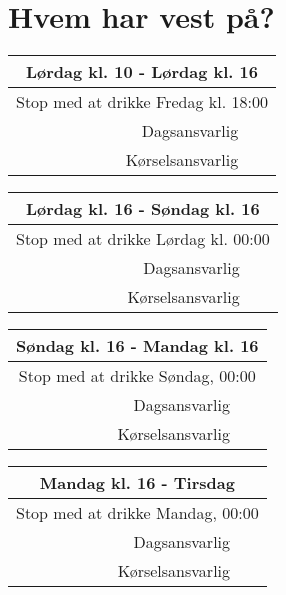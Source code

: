 \section{Hvem har vest på?}
\begin{center}
\begin{tabularx}{0.5\textwidth}{|r|X|}
\hline \multicolumn{2}{|c|}{\textbf{Lørdag kl. 10 - Lørdag kl. 16}} \\
\hline \multicolumn{2}{|c|}{Stop med at drikke Fredag kl. 18:00} \\
\hline\hline Dagsansvarlig &  \\
\hline Kørselsansvarlig &  \\
\hline
\end{tabularx}

\begin{tabularx}{0.5\textwidth}{|r|X|}
\hline \multicolumn{2}{|c|}{\textbf{Lørdag kl. 16 - Søndag kl. 16}} \\
\hline \multicolumn{2}{|c|}{Stop med at drikke Lørdag kl. 00:00} \\
\hline\hline Dagsansvarlig &  \\
\hline Kørselsansvarlig &  \\
\hline
\end{tabularx}

\begin{tabularx}{0.5\textwidth}{|r|X|}
\hline \multicolumn{2}{|c|}{\textbf{Søndag kl. 16 - Mandag kl. 16}} \\
\hline \multicolumn{2}{|c|}{Stop med at drikke Søndag, 00:00} \\
\hline\hline Dagsansvarlig &  \\
\hline Kørselsansvarlig &  \\
\hline
\end{tabularx}

\begin{tabularx}{0.5\textwidth}{|r|X|}
\hline \multicolumn{2}{|c|}{\textbf{Mandag kl. 16 - Tirsdag}} \\
\hline \multicolumn{2}{|c|}{Stop med at drikke Mandag, 00:00} \\
\hline\hline Dagsansvarlig &  \\
\hline Kørselsansvarlig &  \\
\hline
\end{tabularx}
\end{center}

